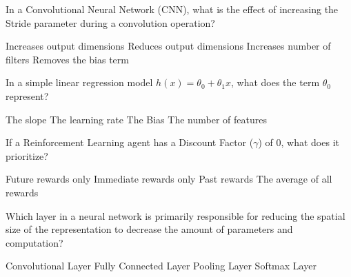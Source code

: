 \documentclass[12pt]{exam}
\begin{document}
\begin{questions}
                \question In a Convolutional Neural Network (CNN), what is the effect of increasing the Stride parameter during a convolution operation? \\
                \begin{oneparchoices}
                    \choice Increases output dimensions
                    \choice Reduces output dimensions %
                    \choice Increases number of filters
                    \choice Removes the bias term
                \end{oneparchoices}
                
                \question In a simple linear regression model $h(x) = \theta_0 + \theta_1 x$, what does the term $\theta_0$ represent? \\
                \begin{oneparchoices}
                    \choice The slope
                    \choice The learning rate
                    \choice The Bias %
                    \choice The number of features
                \end{oneparchoices}
                
                \question If a Reinforcement Learning agent has a Discount Factor ($\gamma$) of 0, what does it prioritize? \\
                \begin{oneparchoices}
                    \choice Future rewards only
                    \choice Immediate rewards only %
                    \choice Past rewards
                    \choice The average of all rewards
                \end{oneparchoices}
                
                \question Which layer in a neural network is primarily responsible for reducing the spatial size of the representation to decrease the amount of parameters and computation? \\
                \begin{oneparchoices}
                    \choice Convolutional Layer
                    \choice Fully Connected Layer
                    \choice Pooling Layer %
                    \choice Softmax Layer
                \end{oneparchoices}
                

\end{questions}
\end{document}
